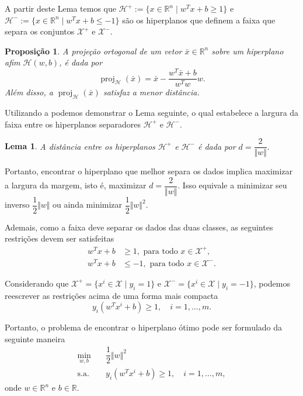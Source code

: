 \documentclass{beamer}
\DeclareMathOperator{\proj}{proj}
\def\Xset{\mathcal{X}}
\def\Hset{\mathcal{H}}
\def\RR{\mathds{R}}
\def\xbar{\bar{x}}
\newtheorem{prop}{Proposição}
\newtheorem{lema}{Lema}
\theoremstyle{definition}%
\begin{document}

\begin{frame}
A partir deste Lema temos que $\Hset^{+}:=\{x\in \RR^n \mid w^{T}x+b\geq 1\}$ e $\Hset^{-}:=\{x\in \RR^n \mid w^{T}x+b\leq -1\}$ são os hiperplanos que definem a faixa que separa os conjuntos $\Xset^{+}$ e $\Xset^{-}$.

\begin{prop} \label{prop1} A projeção ortogonal de um vetor $\xbar\in \RR^n$ sobre um hiperplano afim $\Hset(w,b)$, é dada por
	\[ \proj_{\Hset}(\xbar)= \xbar - \dfrac{w^{T}\xbar+b}{w^{T}w}w. \]
	Além disso, a $\proj_{\Hset}(\xbar)$ satisfaz a menor distância.
\end{prop}
\end{frame}


\begin{frame}
Utilizando a  podemos demonstrar o Lema seguinte, o qual estabelece a largura da faixa entre os hiperplanos separadores $\Hset^{+}$ e $\Hset^{-}$.

\begin{lema} A distância entre os hiperplanos $\Hset^{+}$ e $\Hset^{-}$ é dada por $d=\dfrac{2}{\Vert w\Vert}.$
\end{lema}
\end{frame}


\begin{frame}
Portanto, encontrar o hiperplano que melhor separa os dados implica maximizar a largura da margem, isto é, maximizar $d=\dfrac{2}{\Vert w\Vert }$. Isso equivale a minimizar seu inverso $\dfrac{1}{2}\Vert w\Vert $ ou ainda minimizar $\dfrac{1}{2}\Vert w\Vert^{2}$.

Ademais, como a faixa deve separar os dados das duas classes, as seguintes restrições devem ser satisfeitas
\begin{align}
w^{T}x+b &\geq 1 , \text{ para  todo } x\in \Xset^{+}, \\
w^{T}x+b &\leq -1 , \text{ para  todo } x\in \Xset^{-}.
\end{align}

Considerando que $\Xset^{+}=\{x^i \in \Xset\mid y_i=1\}$ e $\Xset^{-}=\{x^i \in \Xset \mid y_i=-1\}$, podemos reescrever as restrições acima de uma forma mais compacta 
\[ y_{i}(w^{T}x^{i}+b)\geq 1, \quad i=1, \ldots ,m. \]
\end{frame}


\begin{frame}
Portanto, o problema de encontrar o hiperplano ótimo pode ser formulado da seguinte maneira
\[ \label{eq5}
\begin{aligned}
\min_{w,b} & \quad \dfrac{1}{2} \Vert w\Vert^{2} \\
\text{s.a.} &  \quad y_i(w^{T}x^{i}+b) \geq 1, \quad i=1, \ldots , m, \end{aligned}
\]
onde $w\in \RR^{n}$ e $b\in \RR$. 
\end{frame}
\end{document}
